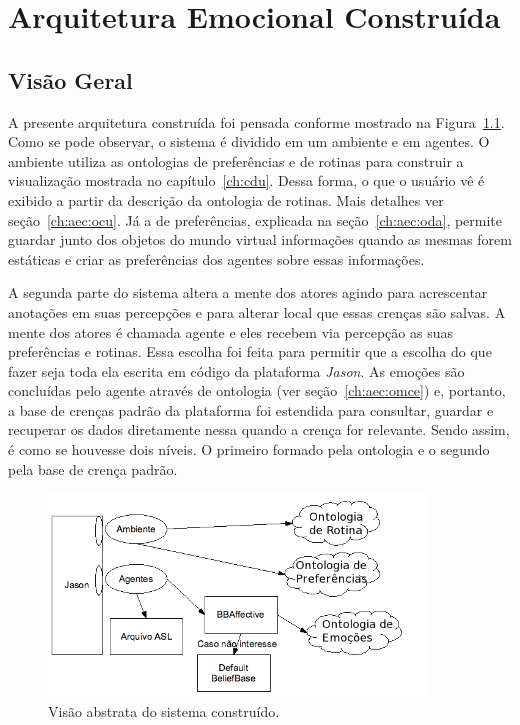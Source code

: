 \chapter{Arquitetura Emocional Constru\'ida} \label{ch:aec}

\section{Visão Geral}

A presente arquitetura construída foi pensada conforme mostrado na
Figura~\ref{fig:vasc}. Como se pode observar, o sistema é dividido em um
ambiente e em agentes. O ambiente utiliza as ontologias de preferências e de
rotinas para construir a visualização mostrada no capítulo~\ref{ch:cdu}. Dessa
forma, o que o usuário vê é exibido a partir da descrição da ontologia de
rotinas. Mais detalhes ver seção~\ref{ch:aec:ocu}. Já a de preferências,
explicada na seção~\ref{ch:aec:oda}, permite guardar junto dos objetos do
mundo virtual informações quando as mesmas forem estáticas e criar as
preferências dos agentes sobre essas informações.\dev{}

A segunda parte do sistema altera a mente dos atores agindo para acrescentar
anotações em suas percepções e para alterar local que essas crenças são
salvas. A mente dos atores é chamada agente e eles recebem via percepção as suas
preferências e rotinas\dev{}. Essa escolha foi feita para permitir que a
escolha do que fazer seja toda ela escrita em código\dev{} da plataforma
\emph{Jason}. As emoções são concluídas pelo agente através de ontologia
(ver seção~\ref{ch:aec:omce}) e, portanto, a base de crenças padrão da
plataforma foi estendida para consultar, guardar e recuperar os dados
diretamente nessa quando a crença for relevante. Sendo assim, é como se
houvesse dois níveis. O primeiro formado pela ontologia e o segundo pela base
de crença padrão.

\begin{figure}
  \centering
  \includegraphics[width=10cm]{figuras/visao-geral.png}
  \caption{Visão abstrata do sistema construído.}
  \label{fig:vasc}
\end{figure}

